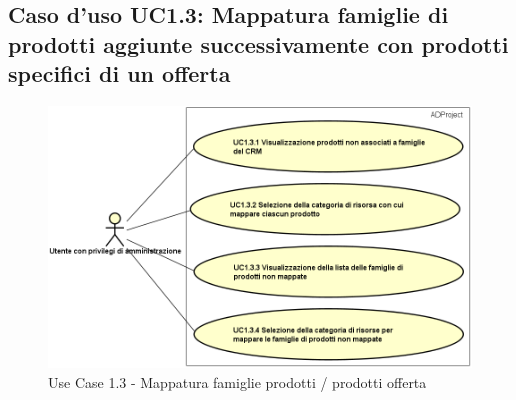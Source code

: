 	\subsection{Caso d'uso UC1.3: Mappatura famiglie di prodotti aggiunte successivamente con prodotti specifici di un offerta}
	\begin{figure}[H]
		\centering
		\includegraphics[scale=0.6]{images/useCase/UC1_3}
		\caption{Use Case 1.3 - Mappatura famiglie prodotti / prodotti offerta}
		\label{fig:uc1.3}
	\end{figure}
